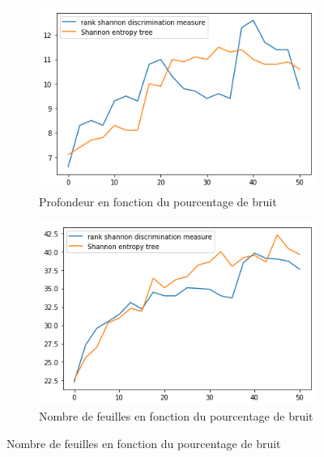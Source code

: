 \documentclass[a4paper]{article}
\begin{document}
\begin{figure}[H]
    \begin{subfigure}[c]{0.46\textwidth}
        \centering
        \includegraphics[width=\textwidth]{images/depth_5.png}
        \caption{Profondeur en fonction du pourcentage de bruit}
    \label{subresults:depth5}
    \end{subfigure}
    \begin{subfigure}[c]{0.46\textwidth}
        \centering
        \includegraphics[width=\textwidth]{images/leaves_5.png}
        \caption{Nombre de feuilles en fonction du pourcentage de bruit}
    \label{subresults:leaves5}
    \end{subfigure}


\end{figure}
\end{document}
